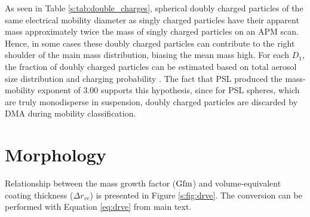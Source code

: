 \documentclass[12pt]{article}
\begin{document}
\noindent As seen in Table \ref{s:tab:double_charges}, spherical doubly charged particles of the same electrical mobility diameter as singly charged particles have their apparent mass approximately twice the mass of singly charged particles on an APM scan. Hence, in some cases these doubly charged particles can contribute to the right shoulder of the main mass distribution, biasing the mean mass high. For each $D_1$, the fraction of doubly charged particles can be estimated based on total aerosol size distribution and charging probability \citep{RN10}. The fact that PSL produced the mass-mobility exponent of 3.00 supports this hypothesis, since for PSL spheres, which are truly monodisperse in suspension, doubly charged particles are discarded by DMA during mobility classification.



\section{Morphology}


Relationship between the mass growth factor ($\rm Gfm$) and volume-equivalent coating thickness ($\Delta r_{ve}$) is presented in Figure \ref{s:fig:drve}. The conversion can be performed with Equation \ref{eq:drve} from main text.
\end{document}
